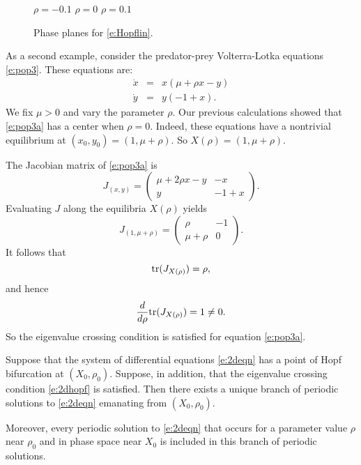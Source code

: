 \documentclass{ximera}
\begin{document}
\begin{figure*}[htb]
           \centerline{%
           }
	\vspace*{-0.2in}
	\hspace{0.3in} $\rho=-0.1$  \hspace{1.7in} $\rho=0$
		\hspace{1.8in} $\rho=0.1$ 
           \caption{Phase planes for \protect\eqref{e:Hopflin}.}
           \label{F:Hopfabc}
\end{figure*}


As a second example, consider the predator-prey Volterra-Lotka 
equations \eqref{e:pop3}.  These equations are: 
\begin{equation} \label{e:pop3a}
\begin{array}{rcl}
\dot{x} & = & x(\mu + \rho x -       y) \\
\dot{y} & = & y( -1 +       x).
\end{array}
\end{equation}   
We fix $\mu>0$ and vary the parameter $\rho$.  Our previous 
calculations showed that \eqref{e:pop3a} has a center when 
$\rho=0$.  Indeed, these equations have a nontrivial equilibrium 
at $(x_0,y_0)=(1, \mu+\rho)$.  So $X(\rho)=(1,\mu+\rho)$.

The Jacobian matrix of \eqref{e:pop3a} is
\[
J_{(x,y)} = \left(\begin{array}{cc} \mu + 2\rho x - y & -x \\
y & -1 + x \end{array}\right).
\]
Evaluating $J$ along the equilibria $X(\rho)$ yields
\[
J_{(1,\mu+\rho)} = \left(\begin{array}{cc} \rho & -1 \\
\mu+\rho & 0 \end{array}\right).
\]
It follows that
\[
{\rm tr}(J_{X(\rho)}) = \rho,
\]
and hence 
\[
\frac{d}{d\rho} {\rm tr}(J_{X(\rho)}) = 1 \neq 0.
\]
So the eigenvalue crossing condition is satisfied for equation 
\eqref{e:pop3a}.  

\begin{theorem}  \label{T:2dhopf}
Suppose that the system of differential equations \eqref{e:2deqn}
has a point of Hopf bifurcation at $(X_0,\rho_0)$.  Suppose, in 
addition, that the 
eigenvalue crossing 
condition \eqref{e:2dhopf} 
is satisfied.  Then there exists a unique branch of periodic 
solutions to \eqref{e:2deqn} emanating from $(X_0,\rho_0)$. 

Moreover, every periodic solution to \eqref{e:2deqn} that occurs for
a parameter value $\rho$ near $\rho_0$ and in phase space near $X_0$ 
is included in this branch of periodic solutions.
\end{theorem}  
\end{document}
